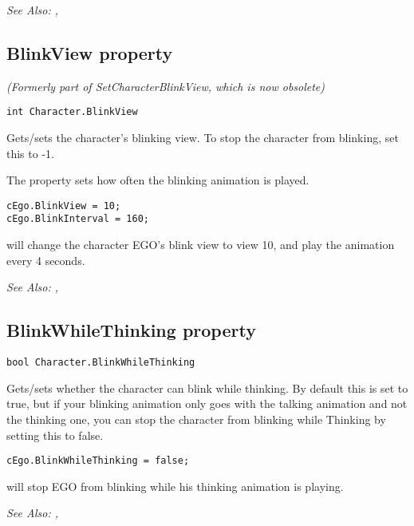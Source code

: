 \it{See Also:} ,



\subsection{BlinkView property}\label{Character.BlinkView}%

\it{(Formerly part of SetCharacterBlinkView, which is now obsolete)}

\begin{verbatim}
int Character.BlinkView
\end{verbatim}
Gets/sets the character's blinking view. To stop the character from blinking, set
this to -1.

The  property sets how often the blinking
animation is played.

\begin{verbatim}
cEgo.BlinkView = 10;
cEgo.BlinkInterval = 160;
\end{verbatim}
will change the character EGO's blink view to view 10, and play the animation every 4 seconds.

\it{See Also:} ,


\subsection{BlinkWhileThinking property}\label{Character.BlinkWhileThinking}%

\begin{verbatim}
bool Character.BlinkWhileThinking
\end{verbatim}
Gets/sets whether the character can blink while thinking. By default this is set to true,
but if your blinking animation only goes with the talking animation and not the thinking
one, you can stop the character from blinking while Thinking by setting this to false.

\begin{verbatim}
cEgo.BlinkWhileThinking = false;
\end{verbatim}
will stop EGO from blinking while his thinking animation is playing.

\it{See Also:} ,


